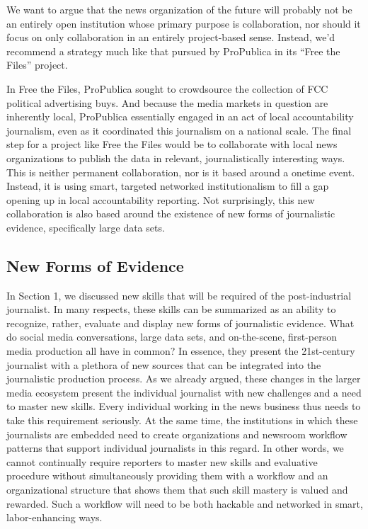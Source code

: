 We want to argue that the news organization of the future will probably not be
an entirely open institution whose primary purpose is collaboration, nor should
it focus on only collaboration in an entirely project-based sense. Instead, we’d
recommend a strategy much like that pursued by ProPublica in its ``Free the
Files'' project.

In Free the Files, ProPublica sought to crowdsource the collection of FCC
political advertising buys. And because the media markets in question are
inherently local, ProPublica essentially engaged in an act of local accountability
journalism, even as it coordinated this journalism on a national scale. The
final step for a project like Free the Files would be to collaborate with local
news organizations to publish the data in relevant, journalistically interesting
ways. This is neither permanent collaboration, nor is it based around a onetime
event. Instead, it is using smart, targeted networked institutionalism to fill
a gap opening up in local accountability reporting. Not surprisingly, this new
collaboration is also based around the existence of new forms of journalistic
evidence, specifically large data sets.

\subsection{New Forms of Evidence}
In Section 1, we discussed new skills that will be required of the post-industrial
journalist. In many respects, these skills can be summarized as an ability to recognize,
rather, evaluate and display new forms of journalistic evidence. What do
social media conversations, large data sets, and on-the-scene, first-person media
production all have in common? In essence, they present the 21st-century journalist
with a plethora of new sources that can be integrated into the journalistic
production process.
As we already argued, these changes in the larger media ecosystem present the
individual journalist with new challenges and a need to master new skills. Every
individual working in the news business thus needs to take this requirement
seriously. At the same time, the institutions in which these journalists are embedded
need to create organizations and newsroom workflow patterns that support
individual journalists in this regard.
In other words, we cannot continually require reporters to master new skills and
evaluative procedure without simultaneously providing them with a workflow
and an organizational structure that shows them that such skill mastery is valued
and rewarded. Such a workflow will need to be both hackable and networked in
smart, labor-enhancing ways.
